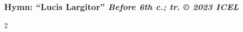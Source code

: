 \subsubsection*{Hymn: ``Lucis Largitor'' \hfill
{\small\itshape Before 6th c.; tr. © 2023 ICEL}}

\begin{multicols*}{2}
        
\end{multicols*}
